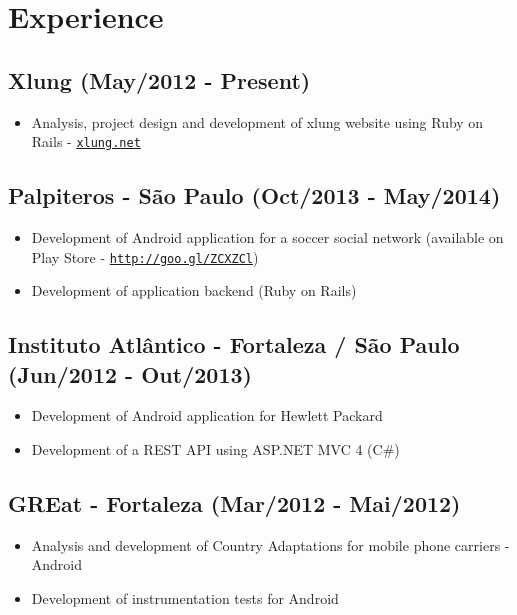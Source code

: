 \documentclass[letterpaper]{article}
\begin{document}
\section*{Experience}
{\addtolength{\leftskip}{3.5mm}

\subsection*{Xlung (May/2012 - Present)}
\begin{itemize}
\item Analysis, project design and development of xlung website using Ruby on Rails - \href{http://xlung.net}{\tt xlung.net}
\end{itemize}

\subsection*{Palpiteros - São Paulo (Oct/2013 - May/2014)}
\begin{itemize}
\item Development of Android application for a soccer social network (available on Play Store - \href{http://goo.gl/ZCXZCl}{\tt http://goo.gl/ZCXZCl})
\item Development of application backend (Ruby on Rails)
\end{itemize}

\subsection*{Instituto Atlântico - Fortaleza / São Paulo (Jun/2012 - Out/2013)}
\begin{itemize}
\item Development of Android application for Hewlett Packard
\item Development of a REST API using ASP.NET MVC 4 (C\#)
\end{itemize}

\subsection*{GREat - Fortaleza (Mar/2012 - Mai/2012)}
\begin{itemize}
\item Analysis and development of Country Adaptations for mobile phone carriers - Android
\item Development of instrumentation tests for Android
\end{itemize}

}
\end{document}
